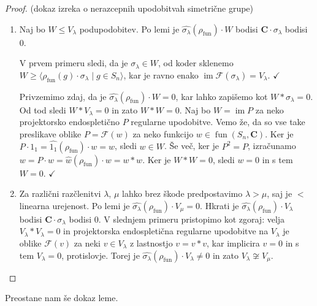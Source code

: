 \documentclass[11pt]{book}
\def\CC{\mathbf{C}}
\def\Fcal{\mathcal{F}}
\def\youngsym{\sigma_{\lambda}}
\DeclareMathOperator\image{im}
\DeclareMathOperator\fun{fun}
\def\kljuka{$\checkmark$}
\theoremstyle{definition}
\theoremstyle{zgled}
\theoremstyle{zgledbrezstevilke}
\theoremstyle{odprtproblem}
\theoremstyle{domacanaloga}
\newenvironment{dokaz}
    {\color{siva}\begin{proof}}
    {\end{proof}}
\theoremstyle{izrek}
\begin{document}
\begin{dokaz}(dokaz izreka o nerazcepnih upodobitvah simetrične grupe) \leavevmode
\begin{enumerate}
    \item Naj bo $W \leq V_{\lambda}$ podupodobitev. Po lemi je $\widehat{\youngsym}(\rho_{\fun}) \cdot W$ bodisi $\CC \cdot \youngsym$ bodisi $0$. 
    
    V prvem primeru sledi, da je $\youngsym \in W$, od koder sklenemo $W \geq \langle \rho_{\fun}(g) \cdot \sigma_\lambda \mid g \in S_n \rangle$, kar je ravno enako $\image \Fcal(\youngsym) = V_{\lambda}$. \kljuka
    
    Privzemimo zdaj, da je $\widehat{\youngsym}(\rho_{\fun}) \cdot W = 0$, kar lahko zapišemo kot $W * \youngsym = 0$. Od tod sledi $W * V_{\lambda} = 0$ in zato $W * W = 0$. Naj bo $W = \image P$ za neko projektorsko endospletično $P$ regularne upodobitve. Vemo že, da so vse take preslikave oblike $P = \Fcal(w)$ za neko funkcijo $w \in \fun(S_n, \CC)$. Ker je $P \cdot 1_1 = \widehat{1_1}(\rho_{\fun}) \cdot w = w$, sledi $w \in W$. Še več, ker je $P^2 = P$, izračunamo $w = P \cdot w = \widehat{w}(\rho_{\fun}) \cdot w = w * w$. Ker je $W * W = 0$, sledi $w = 0$ in s tem $W = 0$. \kljuka

    \item Za različni razčlenitvi $\lambda$, $\mu$ lahko brez škode predpostavimo $\lambda > \mu$, saj je $<$ linearna urejenost. Po lemi je $\widehat{\youngsym}(\rho_{\fun}) \cdot V_{\mu} = 0$. Hkrati je $\widehat{\youngsym}(\rho_{\fun}) \cdot V_{\lambda}$ bodisi $\CC \cdot \youngsym$ bodisi $0$. V slednjem primeru pristopimo kot zgoraj: velja $V_{\lambda} * V_{\lambda} = 0$ in projektorska endospletična regularne upodobitve na $V_{\lambda}$ je oblike $\Fcal(v)$ za neki $v \in V_{\lambda}$ z lastnostjo $v = v * v$, kar implicira $v = 0$ in s tem $V_{\lambda} = 0$, protislovje. Torej je $\widehat{\youngsym}(\rho_{\fun}) \cdot V_{\lambda} \neq 0$ in zato $V_{\lambda} \not\cong V_{\mu}$.
\end{enumerate}
\end{dokaz}

Preostane nam še dokaz leme.
\end{document}
